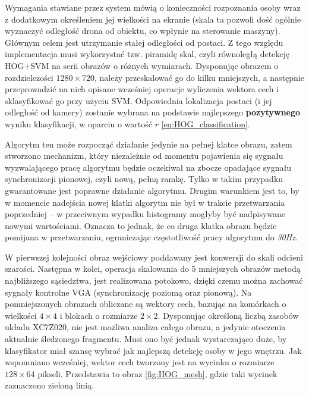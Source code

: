Wymagania stawiane przez system mówią o konieczności rozpoznania osoby wraz z dodatkowym określeniem jej wielkości na ekranie (skala ta pozwoli dość ogólnie wyznaczyć odległość drona od obiektu, co wpłynie na sterowanie maszyny). Głównym celem jest utrzymanie stałej odległości od postaci. %
Z tego względu implementacja musi wykorzystać tzw. piramidę skal, czyli równoległą detekcję HOG+SVM na serii obrazów o różnych wymiarach. %
Dysponując obrazem o rozdzielczości $1280 \times720$, należy przeskalować go do kilku mniejszych, a następnie przeprowadzić na nich opisane wcześniej operacje wyliczenia wektora cech i sklasyfikować go przy użyciu SVM. 
Odpowiednia lokalizacja postaci (i jej odległość od kamery) zostanie wybrana na podstawie najlepszego \textbf{pozytywnego} wyniku klasyfikacji, w oparciu o wartość $r$ \eqref{eq:HOG_classification}. %

Algorytm ten może rozpocząć działanie jedynie na pełnej klatce obrazu, zatem stworzono mechanizm, który niezależnie od momentu pojawienia się sygnału wyzwalającego pracę algorytmu będzie oczekiwał na zbocze opadające sygnału synchronizacji pionowej, czyli nową, pełną ramkę. Tylko w takim przypadku gwarantowane jest poprawne działanie algorytmu. %
Drugim warunkiem jest to, by w momencie nadejścia nowej klatki algorytm nie był w trakcie przetwarzania poprzedniej -- w przeciwnym wypadku histogramy mogłyby być nadpisywane nowymi wartościami. 
Oznacza to jednak, że co druga klatka obrazu będzie pomijana w przetwarzaniu, ograniczając częstotliwość pracy algorytmu do \textit{30Hz}.

W pierwszej kolejności obraz wejściowy poddawany jest konwersji do skali odcieni szarości. 
Następna w kolei, operacja skalowania do 5 mniejszych obrazów metodą najbliższego sąsiedztwa, jest realizowana potokowo, dzięki czemu można zachować sygnały kontrolne VGA (synchronizację poziomą oraz pionową). %
Na pomniejszonych obrazach obliczane są wektory cech, bazując na komórkach o wielkości $4\times 4$ i blokach o rozmiarze $2\times2$. 
Dysponując określoną liczbą zasobów układu XC7Z020, nie jest możliwa analiza całego obrazu, a jedynie otoczenia aktualnie śledzonego fragmentu.
Musi ono być jednak wystarczająco duże, by klasyfikator miał szansę wybrać jak najlepszą detekcję osoby w jego wnętrzu. 
Jak wspomniano wcześniej, wektor cech tworzony jest na wycinku o rozmiarze $128\times 64$ pikseli. 
Przedstawia to obraz \ref{fig:HOG_mesh}, gdzie taki wycinek zaznaczono zieloną linią. %

